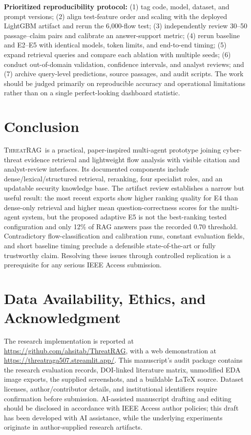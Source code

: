 \documentclass[journal,twoside]{IEEEtran}
\newcommand{\TR}{\textsc{ThreatRAG}}
\begin{document}
\textbf{Prioritized reproducibility protocol:} (1) tag code, model, dataset, and prompt versions; (2) align test-feature order and scaling with the deployed LightGBM artifact and rerun the 6,000-flow test; (3) independently review 30--50 passage--claim pairs and calibrate an answer-support metric; (4) rerun baseline and E2--E5 with identical models, token limits, and end-to-end timing; (5) expand retrieval queries and compare each ablation with multiple seeds; (6) conduct out-of-domain validation, confidence intervals, and analyst reviews; and (7) archive query-level predictions, source passages, and audit scripts. The work should be judged primarily on reproducible accuracy and operational limitations rather than on a single perfect-looking dashboard statistic.

\section{Conclusion}
\TR\ is a practical, paper-inspired multi-agent prototype joining cyber-threat evidence retrieval and lightweight flow analysis with visible citation and analyst-review interfaces. Its documented components include dense/lexical/structured retrieval, reranking, four specialist roles, and an updatable security knowledge base. The artifact review establishes a narrow but useful result: the most recent exports show higher ranking quality for E4 than dense-only retrieval and higher mean question-correctness scores for the multi-agent system, but the proposed adaptive E5 is not the best-ranking tested configuration and only 12\% of RAG answers pass the recorded 0.70 threshold. Contradictory flow-classification and calibration runs, constant evaluation fields, and short baseline timing preclude a defensible state-of-the-art or fully trustworthy claim. Resolving these issues through controlled replication is a prerequisite for any serious IEEE Access submission.

\section*{Data Availability, Ethics, and Acknowledgment}
The research implementation is reported at \url{https://github.com/ahsitab/ThreatRAG}, with a web demonstration at \url{https://threatraga507.streamlit.app/}. This manuscript's audit package contains the research evaluation records, DOI-linked literature matrix, unmodified EDA image exports, the supplied screenshots, and a buildable LaTeX source. Dataset licenses, author/contributor details, and institutional identifiers require confirmation before submission. AI-assisted manuscript drafting and editing should be disclosed in accordance with IEEE Access author policies; this draft has been developed with AI assistance, while the underlying experiments originate in author-supplied research artifacts.

\end{document}
